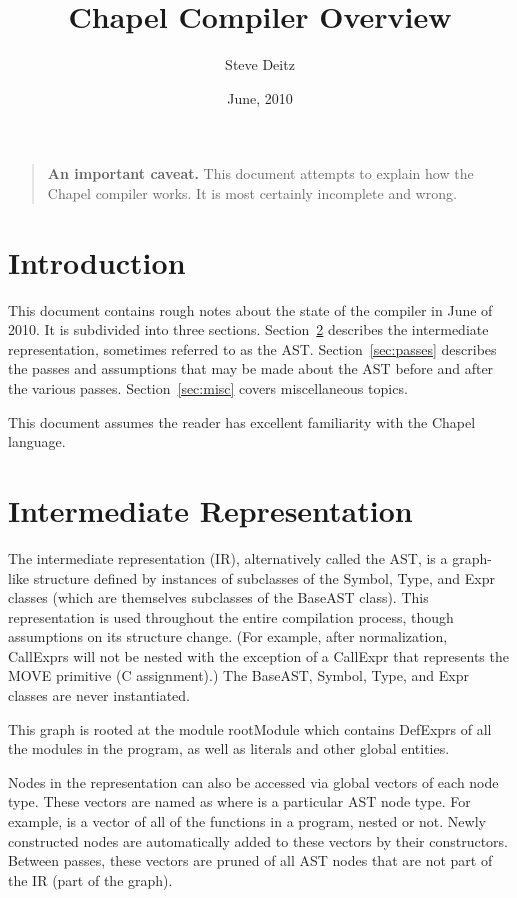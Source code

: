 \documentclass[10pt]{article}
\title{Chapel Compiler Overview}
\author{Steve Deitz}
\date{June, 2010}
\begin{document}
\maketitle

\begin{quote}
\footnotesize
{\bf An important caveat.}  This document attempts to explain how the
Chapel compiler works.  It is most certainly incomplete and wrong.
\end{quote}

\section{Introduction}

This document contains rough notes about the state of the compiler in
June of 2010.  It is subdivided into three sections.
Section~\ref{sec:ast} describes the intermediate representation,
sometimes referred to as the AST.  Section~\ref{sec:passes} describes
the passes and assumptions that may be made about the AST before and
after the various passes.  Section~\ref{sec:misc} covers miscellaneous
topics.

This document assumes the reader has excellent familiarity with the
Chapel language.

\section{Intermediate Representation}
\label{sec:ast}

The intermediate representation (IR), alternatively called the AST, is
a graph-like structure defined by instances of subclasses of the
Symbol, Type, and Expr classes (which are themselves subclasses of the
BaseAST class).  This representation is used throughout the entire
compilation process, though assumptions on its structure change.  (For
example, after normalization, CallExprs will not be nested with the
exception of a CallExpr that represents the MOVE primitive (C
assignment).)  The BaseAST, Symbol, Type, and Expr classes are never
instantiated.

This graph is rooted at the module rootModule which contains DefExprs
of all the modules in the program, as well as literals and other
global entities.

Nodes in the representation can also be accessed via global vectors of
each node type.  These vectors are named as  where 
is a particular AST node type.  For example,  is a
vector of all of the functions in a program, nested or not.  Newly
constructed nodes are automatically added to these vectors by their
constructors.  Between passes, these vectors are pruned of all AST
nodes that are not part of the IR (part of the graph).
\end{document}
